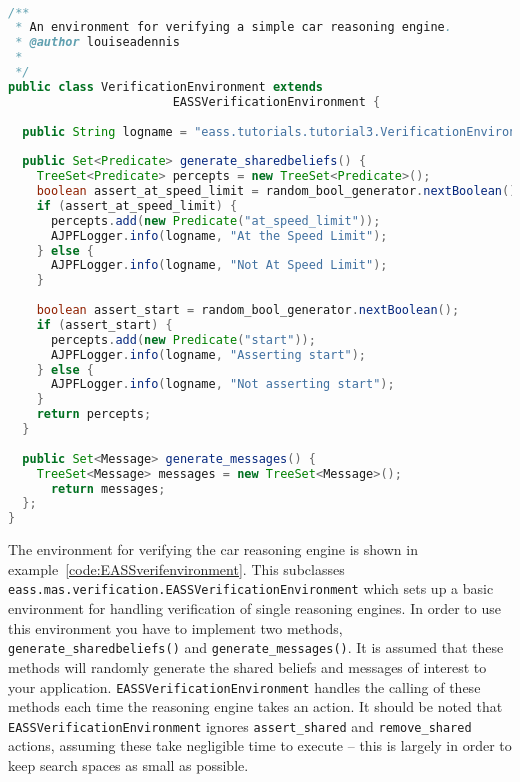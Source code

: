 \begin{ourexample}
\label{code:EASSverifenvironment} \quad \\
\begin{lstlisting}[basicstyle=\sffamily,style=easslisting,language=Java]
/**
 * An environment for verifying a simple car reasoning engine.
 * @author louiseadennis
 *
 */
public class VerificationEnvironment extends 
                       EASSVerificationEnvironment {
			
  public String logname = "eass.tutorials.tutorial3.VerificationEnvironment";
	
  public Set<Predicate> generate_sharedbeliefs() {
    TreeSet<Predicate> percepts = new TreeSet<Predicate>();
    boolean assert_at_speed_limit = random_bool_generator.nextBoolean();
    if (assert_at_speed_limit) {
      percepts.add(new Predicate("at_speed_limit"));
      AJPFLogger.info(logname, "At the Speed Limit");
    } else {
      AJPFLogger.info(logname, "Not At Speed Limit");
    }
		
    boolean assert_start = random_bool_generator.nextBoolean();
    if (assert_start) {
      percepts.add(new Predicate("start"));
      AJPFLogger.info(logname, "Asserting start");
    } else {
      AJPFLogger.info(logname, "Not asserting start");
    }
    return percepts;
  }
	
  public Set<Message> generate_messages() {
    TreeSet<Message> messages = new TreeSet<Message>();
      return messages;
  };
}
\end{lstlisting}
\end{ourexample}
\begin{sloppypar}
The environment for verifying the car reasoning engine is shown in example~\ref{code:EASSverifenvironment}.  This subclasses \texttt{eass.mas.verification.EASSVerificationEnvironment} which sets up a basic environment for handling verification of single reasoning engines.  In order to use this environment you have to implement two methods, \texttt{generate\_sharedbeliefs()} and \texttt{generate\_messages()}.  It is assumed that these methods will randomly generate the shared beliefs and messages of interest to your application.  \texttt{EASSVerificationEnvironment} handles the calling of these methods each time the reasoning engine takes an action.  It should be noted that \texttt{EASSVerificationEnvironment} ignores \lstinline{assert_shared} and \lstinline{remove_shared} actions, assuming these take negligible time to execute -- this is largely in order to keep search spaces as small as possible.
\end{sloppypar}

